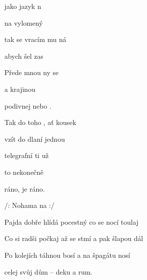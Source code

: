 



\zs
{} jako jazyk  n

na vylomený 

tak se vracím mu ná

abych šel zas 

{Přede} mnou ny se 

a  krajinou 

podivnej   nebo .
\ks

\zr
Tak do toho , ať  kousek 

vzít do dlaní   jednou 

telegrafní   ti už 

to nekonečně   

 ráno, je ráno.

/: Nohama   na  :/
\kr

\zs
Pajda dobře hlídá pocestný co se nocí toulaj

Co si radši počkaj až se stmí a pak šlapou dál

Po kolejích táhnou bosí a na špagátu nosí

celej svůj dům -- deku a rum.
\ks

\zr  \kr

\kp






















